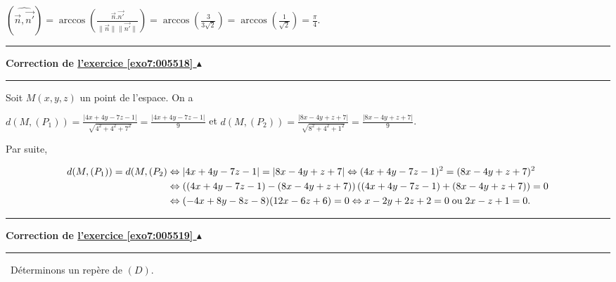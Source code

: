 \documentclass[11pt,a4paper]{article}
\newcommand{\Arccos}{\mathop{\mathrm{arccos}}\nolimits}
\newcounter{exo}
\newcommand{\correction}[1]{\hypertarget{cor7:#1}{}\label{cor7:#1}{\bf Correction de \hyperlink{exo7:#1}{l'exercice \ref{exo7:#1} $\blacktriangle$}}\vspace{1mm}\hrule\vspace{1mm}}
\newcommand{\fincorrection}{\vspace{1mm}\hrule\vspace*{7mm}}
\begin{document}
\begin{center}
$\left(\widehat{\overrightarrow{n},\overrightarrow{n'}}\right)=\Arccos\left(\frac{\overrightarrow{n}.\overrightarrow{n'}}{\|\overrightarrow{n}\|\|\overrightarrow{n'}\|}\right)=\Arccos\left(\frac{3}{3\sqrt{2}}\right)=\Arccos\left(\frac{1}{\sqrt{2}}\right)=\frac{\pi}{4}$.
\end{center}
\fincorrection
\correction{005518}
Soit $M(x,y,z)$ un point de l'espace. On a 
\begin{center}
$d(M,(P_1))=\frac{\left|4x+4y-7z-1\right|}{\sqrt{4^2+4^2+7^2}}=\frac{\left|4x+4y-7z-1\right|}{9}$ et $d(M,(P_2))=\frac{\left|8x-4y+z+7\right|}{\sqrt{8^2+4^2+1^2}}=\frac{\left|8x-4y+z+7\right|}{9}$.
\end{center}
Par suite,

\begin{align*}\ensuremath
d(M,(P_1))=d(M,(P_2)&\Leftrightarrow|4x+4y-7z-1|=|8x-4y+z+7|\Leftrightarrow(4x+4y-7z-1)^2=(8x-4y+z+7)^2\\
 &\Leftrightarrow\left((4x+4y-7z-1)-(8x-4y+z+7)\right)\left((4x+4y-7z-1)+(8x-4y+z+7)\right)=0\\
 &\Leftrightarrow(-4x+8y-8z-8)(12x-6z+6)=0\Leftrightarrow x-2y+2z+2=0\;\text{ou}\;2x-z+1=0.
\end{align*}
\begin{center}
\end{center}
\fincorrection
\correction{005519}
\textbullet~Déterminons un repère de $(D)$.
\end{document}
